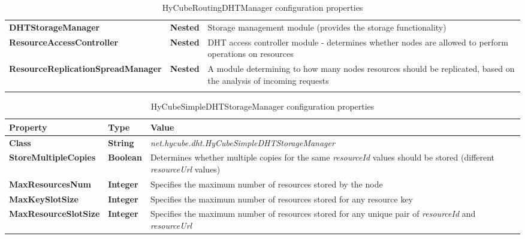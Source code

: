 \begin{center}
\begin{longtable}{p{5cm} p{1.2cm} p{8.3cm}}
	\textbf{DHTStorageManager}							& \textbf{Nested}				& Storage management module (provides the storage functionality)			\\[1.5mm]	
	\textbf{ResourceAccessController}					& \textbf{Nested}				& DHT access controller module - determines whether nodes are allowed to perform operations on resources		\\[1.5mm]	
	\textbf{ResourceReplicationSpreadManager}			& \textbf{Nested}				& A module determining to how many nodes resources should be replicated, based on the analysis of incoming requests		\\[1.5mm]	
    \hline
\caption{HyCubeRoutingDHTManager configuration properties}
\label{tab:libHyCubeRoutingDHTManager}
\end{longtable}
\end{center}





\begin{table}
\scriptsize
\begin{center}
\begin{tabular}{p{5cm} p{1.5cm} p{8.0cm}}
	\hline
	\textbf{Property}						& \textbf{Type}					& \textbf{Value}					\\[1mm]
    \hline
	\textbf{Class}							& \textbf{String}				& \textit{net.hycube.dht.HyCubeSimpleDHTStorageManager}								\\[1.5mm]	
    \textbf{StoreMultipleCopies}			& \textbf{Boolean}				& Determines whether multiple copies for the same \emph{resourceId} values should be stored (different \emph{resourceUrl} values)	\\[1.5mm]	
	\textbf{MaxResourcesNum}				& \textbf{Integer}				& Specifies the maximum number of resources stored by the node						\\[1.5mm]	
	\textbf{MaxKeySlotSize}					& \textbf{Integer}				& Specifies the maximum number of resources stored for any resource key				\\[1.5mm]	
	\textbf{MaxResourceSlotSize}			& \textbf{Integer}				& Specifies the maximum number of resources stored for any unique pair of \emph{resourceId} and \emph{resourceUrl}			\\[1.5mm]	
    \hline
\end{tabular}
\end{center}
\caption{HyCubeSimpleDHTStorageManager configuration properties}
\label{tab:libHyCubeSimpleDHTStorageManager}
\end{table}

